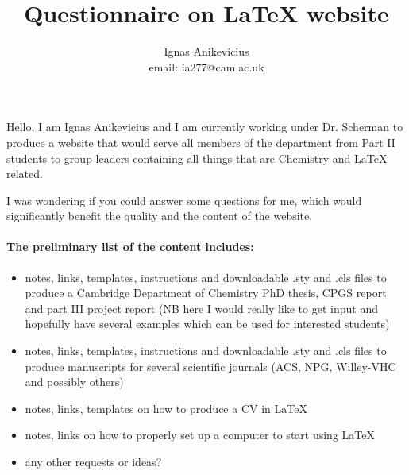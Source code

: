 \documentclass[a4paper]{article}
\begin{document}
\title{Questionnaire on LaTeX website}

\author{Ignas Anikevicius\\ email: ia277@cam.ac.uk}

\maketitle

\thispagestyle{empty}

Hello, I am Ignas Anikevicius and I am currently working under Dr. Scherman to
produce a website that would serve all members of the department from Part II
students to group leaders containing all things that are Chemistry and \LaTeX
related.

I was wondering if you could answer some questions for me, which would
significantly benefit the quality and the content of the website.

\paragraph{The preliminary list of the content includes:}

\begin{itemize}
    \item notes, links, templates, instructions and downloadable .sty and .cls
        files to produce a Cambridge Department of Chemistry PhD thesis, CPGS
        report and part III project report (NB here I would really like to get
        input and hopefully have several examples which can be used for
        interested students)
    \item notes, links, templates, instructions and downloadable .sty and .cls
        files to produce manuscripts for several scientific journals (ACS, NPG,
        Willey-VHC and possibly others)
    \item notes, links, templates on how to produce a CV in LaTeX 
    \item notes, links on how to properly set up a computer to start using LaTeX
    \item any other requests or ideas?
\end{itemize}
\end{document}
